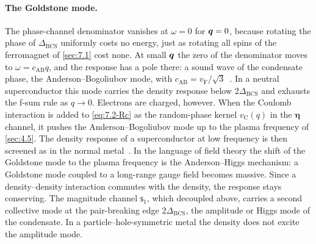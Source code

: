 \paragraph{The Goldstone mode.} The phase-channel denominator vanishes at $\omega = 0$ for $\bm{q} = 0$, because rotating the phase of $\Delta_{\mathrm{BCS}}$ uniformly costs no energy, just as rotating all spins of the ferromagnet of \cref{sec:7.1} cost none. At small $\bm{q}$ the zero of the denominator moves to $\omega = c_{\mathrm{AB}}q$, and the response has a pole there: a sound wave of the condensate phase, the Anderson--Bogoliubov mode, with $c_{\mathrm{AB}} = v_{\mathrm{F}}/\sqrt3$~\cite{anderson1958random}. In a neutral superconductor this mode carries the density response below $2\Delta_{\mathrm{BCS}}$ and exhausts the f-sum rule as $q \to 0$. Electrons are charged, however. When the Coulomb interaction is added to \cref{eq:7.2-Rc} as the random-phase kernel $v_{\mathrm{C}}(q)$ in the $\boldsymbol{\eta}$ channel, it pushes the Anderson--Bogoliubov mode up to the plasma frequency of \cref{sec:4.5}. The density response of a superconductor at low frequency is then screened as in the normal metal~\cite{anderson1958random}. In the language of field theory the shift of the Goldstone mode to the plasma frequency is the Anderson--Higgs mechanism: a Goldstone mode coupled to a long-range gauge field becomes massive. Since a density--density interaction commutes with the density, the response stays conserving. The magnitude channel $\mathsf{s}_1$, which decoupled above, carries a second collective mode at the pair-breaking edge $2\Delta_{\mathrm{BCS}}$, the amplitude or Higgs mode of the condensate. In a particle--hole-symmetric metal the density does not excite the amplitude mode.


